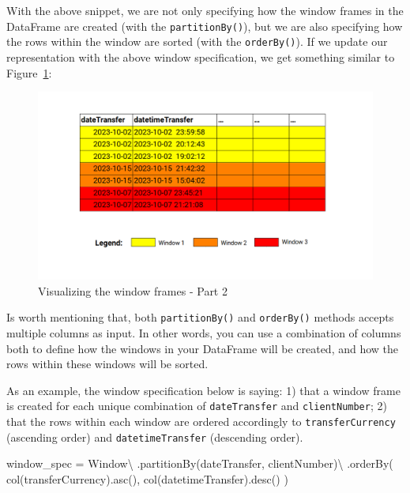 \documentclass[
  11pt,
  letterpaper,
  DIV=11,
  numbers=noendperiod]{scrreprt}
\newenvironment{Shaded}{\begin{snugshade}}{\end{snugshade}}
\newcommand{\NormalTok}[1]{\textcolor[rgb]{0.00,0.23,0.31}{#1}}
\newcommand{\OperatorTok}[1]{\textcolor[rgb]{0.37,0.37,0.37}{#1}}
\newcommand{\StringTok}[1]{\textcolor[rgb]{0.13,0.47,0.30}{#1}}
\begin{document}
With the above snippet, we are not only specifying how the window frames
in the DataFrame are created (with the \texttt{partitionBy()}), but we
are also specifying how the rows within the window are sorted (with the
\texttt{orderBy()}). If we update our representation with the above
window specification, we get something similar to
Figure~\ref{fig-window-spec2}:

\begin{figure}

{\centering \includegraphics[width=1\textwidth,height=\textheight]{Chapters/./../Figures/window-spec2.png}

}

\caption{\label{fig-window-spec2}Visualizing the window frames - Part 2}

\end{figure}

Is worth mentioning that, both \texttt{partitionBy()} and
\texttt{orderBy()} methods accepts multiple columns as input. In other
words, you can use a combination of columns both to define how the
windows in your DataFrame will be created, and how the rows within these
windows will be sorted.

As an example, the window specification below is saying: 1) that a
window frame is created for each unique combination of
\texttt{dateTransfer} and \texttt{clientNumber}; 2) that the rows within
each window are ordered accordingly to \texttt{transferCurrency}
(ascending order) and \texttt{datetimeTransfer} (descending order).

\begin{Shaded}
\begin{Highlighting}[]
\NormalTok{window\_spec }\OperatorTok{=}\NormalTok{ Window}\OperatorTok{\textbackslash{}}
\NormalTok{    .partitionBy(}\StringTok{\textquotesingle{}dateTransfer\textquotesingle{}}\NormalTok{, }\StringTok{\textquotesingle{}clientNumber\textquotesingle{}}\NormalTok{)}\OperatorTok{\textbackslash{}}
\NormalTok{    .orderBy(}
\NormalTok{        col(}\StringTok{\textquotesingle{}transferCurrency\textquotesingle{}}\NormalTok{).asc(),}
\NormalTok{        col(}\StringTok{\textquotesingle{}datetimeTransfer\textquotesingle{}}\NormalTok{).desc()}
\NormalTok{    )}
\end{Highlighting}
\end{Shaded}
\end{document}
